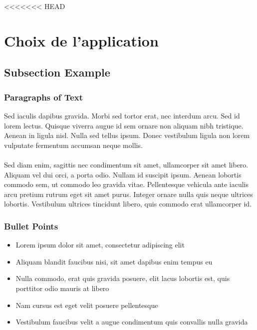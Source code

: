 <<<<<<< HEAD

\section{Choix de l'application} %

\subsection{Subsection Example} %

\begin{frame}
\frametitle{Paragraphs of Text}
Sed iaculis dapibus gravida. Morbi sed tortor erat, nec interdum arcu. Sed id lorem lectus. Quisque viverra augue id sem ornare non aliquam nibh tristique. Aenean in ligula nisl. Nulla sed tellus ipsum. Donec vestibulum ligula non lorem vulputate fermentum accumsan neque mollis.\\~\\

Sed diam enim, sagittis nec condimentum sit amet, ullamcorper sit amet libero. Aliquam vel dui orci, a porta odio. Nullam id suscipit ipsum. Aenean lobortis commodo sem, ut commodo leo gravida vitae. Pellentesque vehicula ante iaculis arcu pretium rutrum eget sit amet purus. Integer ornare nulla quis neque ultrices lobortis. Vestibulum ultrices tincidunt libero, quis commodo erat ullamcorper id.
\end{frame}


\begin{frame}
\frametitle{Bullet Points}
\begin{itemize}
\item Lorem ipsum dolor sit amet, consectetur adipiscing elit
\item Aliquam blandit faucibus nisi, sit amet dapibus enim tempus eu
\item Nulla commodo, erat quis gravida posuere, elit lacus lobortis est, quis porttitor odio mauris at libero
\item Nam cursus est eget velit posuere pellentesque
\item Vestibulum faucibus velit a augue condimentum quis convallis nulla gravida
\end{itemize}
\end{frame}

